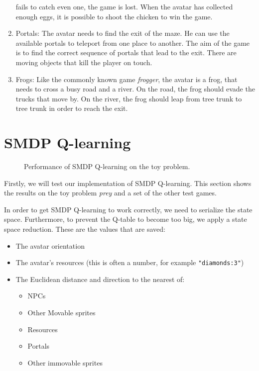 \begin{enumerate}
		fails to catch even one, the game is lost. When the avatar
		has collected enough eggs, it is possible to shoot the chicken to win
		the game.
	\item Portals:
		The avatar needs to find the exit of the maze. He can use the available
		portals to teleport from one place to another. The aim of the game is to
		find the correct sequence of portals that lead to the exit. There are
		moving objects that kill the player on touch.
	\item Frogs:
		Like the commonly known game \textit{frogger}, the avatar is a frog,
		that needs to cross a busy road and a river. On the road, the frog
		should evade the trucks that move by. On the river, the frog should leap
		from tree trunk to tree trunk in order to reach the exit.
\end{enumerate}




\section{SMDP Q-learning}
\begin{figure}
	\centering
	\caption{Performance of SMDP Q-learning on the toy problem.}
	\label{fig:qlearning}
\end{figure}

Firstly, we will test our implementation of SMDP Q-learning. This section shows
the results on the toy problem \textit{prey} and a set of the other test games.

In order to get SMDP Q-learning to work correctly, we need to serialize the
state space. Furthermore, to prevent the Q-table to become too big, we apply a
state space reduction. These are the values that are saved:

\begin{itemize}
	\item The avatar orientation
	\item The avatar's resources (this is often a number, for example
		\texttt{"diamonds:3"})
	\item The Euclidean distance and direction to the nearest of:
		\begin{itemize}
			\item NPCs
			\item Other Movable sprites
			\item Resources
			\item Portals
			\item Other immovable sprites
		\end{itemize}
\end{itemize}

